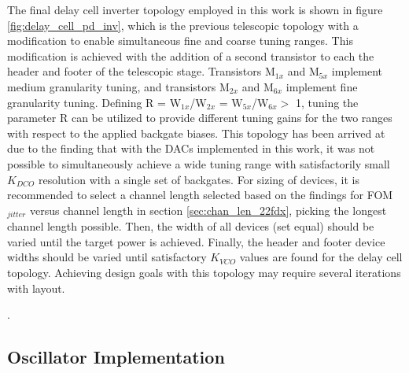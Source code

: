 	The final delay cell inverter topology employed in this work is shown in figure \ref{fig:delay_cell_pd_inv}, which is the previous telescopic topology with a modification to enable simultaneous fine and coarse tuning ranges. This modification is achieved with the addition of a second transistor to each the header and footer of the telescopic stage. Transistors M$_{1x}$ and M$_{5x}$ implement medium granularity tuning, and transistors M$_{2x}$ and M$_{6x}$ implement fine granularity tuning. Defining R = W$_{1x}$/W$_{2x}$ = W$_{5x}$/W$_{6x} >$ 1, tuning the parameter R can be utilized to provide different tuning gains for the two ranges with respect to the applied backgate biases. This topology has been arrived at due to the finding that with the DACs implemented in this work, it was not possible to simultaneously achieve a wide tuning range with satisfactorily small $K_{DCO}$ resolution with a single set of backgates. For sizing of devices, it is recommended to select a channel length selected based on the findings for FOM$_{jitter}$ versus channel length in section \ref{sec:chan_len_22fdx}, picking the longest channel length possible. Then, the width of all devices (set equal) should be varied until the target power is achieved. Finally, the header and footer device widths should be varied until satisfactory $K_{VCO}$ values are found for the delay cell topology. Achieving design goals with this topology may require several iterations with layout.

	{\color{white}.}\FloatBarrier
	\subsection{Oscillator Implementation}
